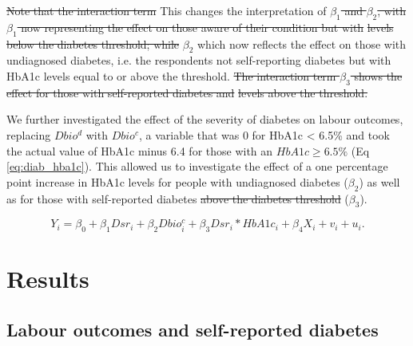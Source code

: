 \documentclass[12pt,english]{article}
\providecommand{\DIFaddtex}[1]{{\protect\color{blue}#1}} %
\providecommand{\DIFdeltex}[1]{{\protect\color{red}\sout{#1}}}                      %
\providecommand{\DIFaddbegin}{} %
\providecommand{\DIFaddend}{} %
\providecommand{\DIFdelbegin}{} %
\providecommand{\DIFdelend}{} %
\providecommand{\DIFadd}[1]{\texorpdfstring{\DIFaddtex{#1}}{#1}} %
\providecommand{\DIFdel}[1]{\texorpdfstring{\DIFdeltex{#1}}{}} %
\begin{document}
\DIFdelbegin \DIFdel{Note that the interaction term }\DIFdelend \DIFaddbegin \DIFadd{This }\DIFaddend changes the interpretation of \DIFdelbegin \DIFdel{$\beta_{1}$ and $\beta_{2}$, with $\beta_{1}$ now representing the effect on those aware of their condition but with }%
\DIFdel{levels below the diabetes threshold; while }\DIFdelend $\beta_{2}$ \DIFaddbegin \DIFadd{which now }\DIFaddend reflects the effect on those with undiagnosed diabetes, i.e. the respondents not self-reporting diabetes but with \ac{HbA1c} levels equal to or above the threshold. 
\DIFdelbegin \DIFdel{The interaction term $\beta_{3}$ shows the effect for those with self-reported diabetes and }%
\DIFdel{levels above the threshold.
}\DIFdelend 

We further investigated the effect of the severity of diabetes on labour outcomes, replacing $Dbio^{d}$ with $Dbio^{c}$, a variable that was $0$ for \ac{HbA1c} < 6.5\% and took the actual value of \ac{HbA1c} \DIFaddbegin \DIFadd{minus 6.4 }\DIFaddend for those with an $HbA1c \geq 6.5\%$ (Eq \ref{eq:diab_hba1c}). This allowed us to investigate the effect of a one percentage point increase in \ac{HbA1c} levels for people with undiagnosed diabetes ($\beta_{2}$) as well as for those with self-reported diabetes \DIFdelbegin \DIFdel{above the diabetes threshold }\DIFdelend ($\beta_{3}$).

\begin{equation}
Y_{i}=\beta_{0}+\beta_{1}Dsr_{i}+\beta_{2}Dbio^{c}_{i}+\beta_{3}Dsr_{i}*HbA1c_{i}+\beta_{4}X_{i}+v_{i}+u_{i}.\label{eq:diab_hba1c}
\end{equation}

\section{\label{sec:cha_4_results}Results}


\subsection{Labour outcomes and self-reported diabetes}
\end{document}
